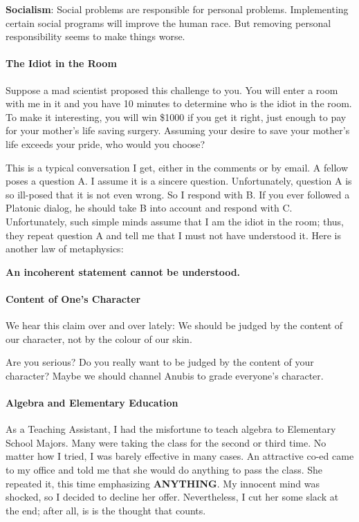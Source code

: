 \textbf{Socialism}: Social problems are responsible for personal problems. Implementing certain social programs will improve the human race. But removing personal responsibility seems to make things worse.

\paragraph{The Idiot in the Room}


Suppose a mad scientist proposed this challenge to you. You will enter a room with me in it and you have 10 minutes to determine who is the idiot in the room. To make it interesting, you will win \$1000 if you get it right, just enough to pay for your mother's life saving surgery. Assuming your desire to save your mother's life exceeds your pride, who would you choose?

This is a typical conversation I get, either in the comments or by email. A fellow poses a question A. I assume it is a sincere question. Unfortunately, question A is so ill-posed that it is not even wrong. So I respond with B. If you ever followed a Platonic dialog, he should take B into account and respond with C. Unfortunately, such simple minds assume that I am the idiot in the room; thus, they repeat question A and tell me that I must not have understood it. Here is another law of metaphysics:

\textbf{An incoherent statement cannot be understood.}


\paragraph{Content of One's Character}


We hear this claim over and over lately: We should be judged by the content of our character, not by the colour of our skin.

Are you serious? Do you really want to be judged by the content of your character? Maybe we should channel Anubis to grade everyone's character.

\paragraph{Algebra and Elementary Education}


As a Teaching Assistant, I had the misfortune to teach algebra to Elementary School Majors. Many were taking the class for the second or third time. No matter how I tried, I was barely effective in many cases. An attractive co-ed came to my office and told me that she would do anything to pass the class. She repeated it, this time emphasizing \textbf{ANYTHING}. My innocent mind was shocked, so I decided to decline her offer. Nevertheless, I cut her some slack at the end; after all, is is the thought that counts.

